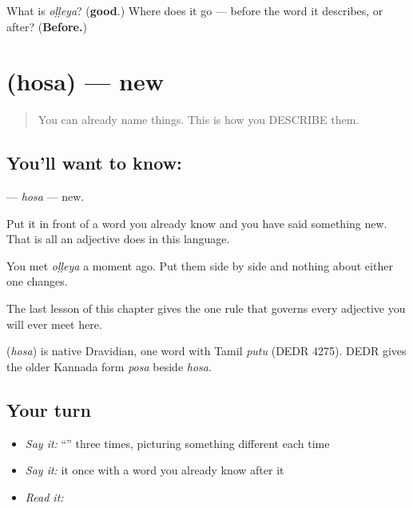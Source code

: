 \begin{tcolorbox}[breakable,colback=teal!4,colframe=teal!35!black,title={Before you move on}]
What is \emph{oḷḷeya}? (\textbf{good}.) Where does it go — before the word it describes, or after? (\textbf{Before.})
\end{tcolorbox}
\section[\texorpdfstring{\kn{ಹೊಸ} (hosa)}{ಹೊಸ (hosa)}]{ (hosa) — new}

\label{lesson:KA-C42-new}



\begin{quote}
You can already name things. This is how you DESCRIBE them.
\end{quote}

\subsection*{You'll want to know: }
\textbf{} — \emph{hosa} — new.

Put it in front of a word you already know and you have said something new. That is all an adjective does in this language.

You met \textbf{} \emph{oḷḷeya} a moment ago. Put them side by side and nothing about either one changes.

The last lesson of this chapter gives the one rule that governs every adjective you will ever meet here.

\begin{cousinweb}
\textbf{} (\emph{hosa}) is native Dravidian, one word with Tamil \emph{putu} (DEDR 4275). DEDR gives the older Kannada form \emph{posa} beside \emph{hosa}.
\end{cousinweb}

\subsection*{Your turn}
\begin{itemize}
\raggedright
  \item \emph{Say it:} \textquotedblleft{}\textquotedblright{} three times, picturing something different each time
  \item \emph{Say it:} it once with a word you already know after it
  \item \emph{Read it:} \textbf{}
\end{itemize}


